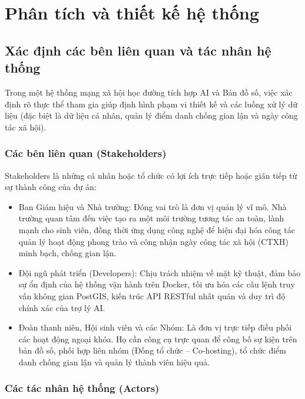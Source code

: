 \chapter{Phân tích và thiết kế hệ thống}

\section{Xác định các bên liên quan và tác nhân hệ thống}

Trong một hệ thống mạng xã hội học đường tích hợp AI và Bản đồ số, việc xác định rõ thực thể tham gia giúp định hình phạm vi thiết kế và các luồng xử lý dữ liệu (đặc biệt là dữ liệu cá nhân, quản lý điểm danh chống gian lận và ngày công tác xã hội). 

\subsection{Các bên liên quan (Stakeholders)}

Stakeholders là những cá nhân hoặc tổ chức có lợi ích trực tiếp hoặc gián tiếp từ sự thành công của dự án:

\begin{itemize}
    \item Ban Giám hiệu và Nhà trường: Đóng vai trò là đơn vị quản lý vĩ mô. Nhà trường quan tâm đến việc tạo ra một môi trường tương tác an toàn, lành mạnh cho sinh viên, đồng thời ứng dụng công nghệ để hiện đại hóa công tác quản lý hoạt động phong trào và công nhận ngày công tác xã hội (CTXH) minh bạch, chống gian lận.

    \item Đội ngũ phát triển (Developers): Chịu trách nhiệm về mặt kỹ thuật, đảm bảo sự ổn định của hệ thống vận hành trên Docker, tối ưu hóa các câu lệnh truy vấn không gian PostGIS, kiến trúc API RESTful nhất quán và duy trì độ chính xác của trợ lý AI.
    
    \item Đoàn thanh niên, Hội sinh viên và các Nhóm: Là đơn vị trực tiếp điều phối các hoạt động ngoại khóa. Họ cần công cụ trực quan để công bố sự kiện trên bản đồ số, phối hợp liên nhóm (Đồng tổ chức -- Co-hosting), tổ chức điểm danh chống gian lận và quản lý thành viên hiệu quả.
\end{itemize}

\subsection{Các tác nhân hệ thống (Actors)}

